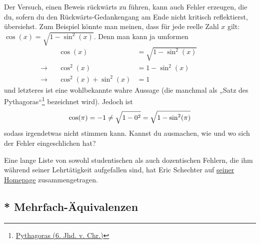 \begin{bem}
    Der Versuch, einen Beweis rückwärts zu führen, kann auch Fehler erzeugen, die du, sofern du den Rückwärts-Gedankengang am Ende nicht kritisch reflektierst, übersiehst. Zum Beispiel könnte man meinen, dass für jede reelle Zahl $x$ gilt: $\cos(x)=\sqrt{1-\sin^2(x)}$. Denn man kann ja umformen
    \begin{align*}
        && \cos(x) & =\sqrt{1-\sin^2(x)} &&&& \\
        \to && \cos^2(x) & = 1-\sin^2(x) &&&& \\
        \to && \cos^2(x) + \sin^2(x) & = 1 &&&&
    \end{align*}
    und letzteres ist eine wohlbekannte wahre Aussage (die manchmal als „Satz des Pythagoras“\footnote{\href{https://de.wikipedia.org/wiki/Pythagoras}{Pythagoras (6. Jhd. v. Chr.)}} bezeichnet wird). Jedoch ist
        \[ \cos(\pi) = -1 \neq \sqrt{\strut 1-0^2} = \sqrt{1-\sin^2(\pi)} \]
    sodass irgendetwas nicht stimmen kann. Kannst du ausmachen, wie und wo sich der Fehler eingeschlichen hat?
\end{bem}


\begin{bem}
 Eine lange Liste von sowohl studentischen als auch dozentischen Fehlern, die ihm während seiner Lehrtätigkeit aufgefallen sind, hat Eric Schechter auf \href{https://math.vanderbilt.edu/schectex/commerrs/}{seiner Homepage} zusammengetragen.
\end{bem}





\subsection*{* Mehrfach-Äquivalenzen}


